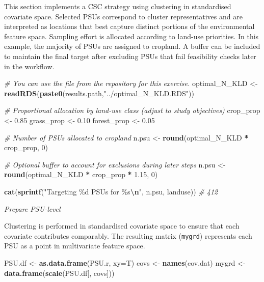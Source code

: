 \documentclass[
  10pt,
  b5paper,
  oneside]{book}
\newenvironment{Shaded}{\begin{snugshade}}{\end{snugshade}}
\newcommand{\AttributeTok}[1]{\textcolor[rgb]{0.13,0.29,0.53}{#1}}
\newcommand{\CommentTok}[1]{\textcolor[rgb]{0.56,0.35,0.01}{\textit{#1}}}
\newcommand{\DecValTok}[1]{\textcolor[rgb]{0.00,0.00,0.81}{#1}}
\newcommand{\FloatTok}[1]{\textcolor[rgb]{0.00,0.00,0.81}{#1}}
\newcommand{\FunctionTok}[1]{\textcolor[rgb]{0.13,0.29,0.53}{\textbf{#1}}}
\newcommand{\NormalTok}[1]{#1}
\newcommand{\OtherTok}[1]{\textcolor[rgb]{0.56,0.35,0.01}{#1}}
\newcommand{\SpecialCharTok}[1]{\textcolor[rgb]{0.81,0.36,0.00}{\textbf{#1}}}
\newcommand{\StringTok}[1]{\textcolor[rgb]{0.31,0.60,0.02}{#1}}
\begin{document}
This section implements a CSC strategy using clustering in standardised covariate space. Selected PSUs correspond to cluster representatives and are interpreted as locations that best capture distinct portions of the environmental feature space. Sampling effort is allocated according to land-use priorities. In this example, the majority of PSUs are assigned to cropland. A buffer can be included to maintain the final target after excluding PSUs that fail feasibility checks later in the workflow.

\begin{Shaded}
\begin{Highlighting}[]
\CommentTok{\# You can use the file from the repository for this exercise. }
\NormalTok{optimal\_N\_KLD }\OtherTok{\textless{}{-}} \FunctionTok{readRDS}\NormalTok{(}\FunctionTok{paste0}\NormalTok{(results.path,}\StringTok{"../optimal\_N\_KLD.RDS"}\NormalTok{))}

\CommentTok{\# Proportional allocation by land{-}use class (adjust to study objectives)}
\NormalTok{crop\_prop   }\OtherTok{\textless{}{-}} \FloatTok{0.85}
\NormalTok{grass\_prop  }\OtherTok{\textless{}{-}} \FloatTok{0.10}
\NormalTok{forest\_prop }\OtherTok{\textless{}{-}} \FloatTok{0.05}

\CommentTok{\# Number of PSUs allocated to cropland}
\NormalTok{n.psu }\OtherTok{\textless{}{-}} \FunctionTok{round}\NormalTok{(optimal\_N\_KLD }\SpecialCharTok{*}\NormalTok{ crop\_prop, }\DecValTok{0}\NormalTok{)}

\CommentTok{\# Optional buffer to account for exclusions during later steps}
\NormalTok{n.psu }\OtherTok{\textless{}{-}} \FunctionTok{round}\NormalTok{(optimal\_N\_KLD }\SpecialCharTok{*}\NormalTok{ crop\_prop }\SpecialCharTok{*} \FloatTok{1.15}\NormalTok{, }\DecValTok{0}\NormalTok{)}

\FunctionTok{cat}\NormalTok{(}\FunctionTok{sprintf}\NormalTok{(}\StringTok{"Targeting \%d PSUs for \%s}\SpecialCharTok{\textbackslash{}n}\StringTok{"}\NormalTok{, n.psu, landuse)) }\CommentTok{\# 412}
\end{Highlighting}
\end{Shaded}

\emph{Prepare PSU-level}

Clustering is performed in standardised covariate space to ensure that each covariate contributes comparably. The resulting matrix (\texttt{mygrd}) represents each PSU as a point in multivariate feature space.

\begin{Shaded}
\begin{Highlighting}[]
\NormalTok{PSU.df }\OtherTok{\textless{}{-}} \FunctionTok{as.data.frame}\NormalTok{(PSU.r, }\AttributeTok{xy=}\NormalTok{T)}
\NormalTok{covs }\OtherTok{\textless{}{-}} \FunctionTok{names}\NormalTok{(cov.dat)}
\NormalTok{mygrd }\OtherTok{\textless{}{-}} \FunctionTok{data.frame}\NormalTok{(}\FunctionTok{scale}\NormalTok{(PSU.df[, covs]))}
\end{Highlighting}
\end{Shaded}
\end{document}
